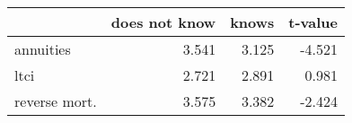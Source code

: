 \begin{tabular}{lrrr}
\toprule
{} &  does not know &  knows &  t-value \\
\midrule
annuities     &          3.541 &  3.125 &   -4.521 \\
ltci          &          2.721 &  2.891 &    0.981 \\
reverse mort. &          3.575 &  3.382 &   -2.424 \\
\bottomrule
\end{tabular}
